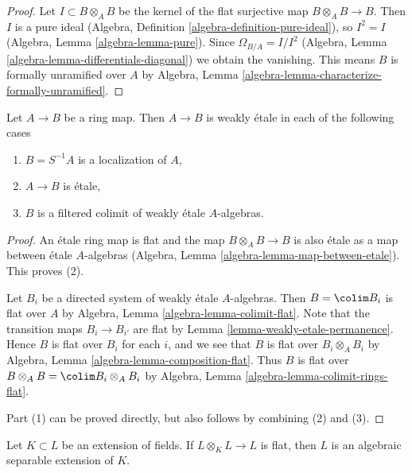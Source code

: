 \begin{proof}
Let $I \subset B \otimes_A B$ be the kernel of the flat surjective map
$B \otimes_A B \to B$. Then $I$ is a pure ideal
(Algebra, Definition \ref{algebra-definition-pure-ideal}),
so $I^2 = I$ (Algebra, Lemma \ref{algebra-lemma-pure}).
Since $\Omega_{B/A} = I/I^2$
(Algebra, Lemma \ref{algebra-lemma-differentials-diagonal})
we obtain the vanishing. This means $B$ is formally unramified over
$A$ by
Algebra, Lemma \ref{algebra-lemma-characterize-formally-unramified}.
\end{proof}

\begin{lemma}
\label{lemma-when-weakly-etale}
Let $A \to B$ be a ring map. Then $A \to B$ is weakly \'etale in each
of the following cases
\begin{enumerate}
\item $B = S^{-1}A$ is a localization of $A$,
\item $A \to B$ is \'etale,
\item $B$ is a filtered colimit of weakly \'etale $A$-algebras.
\end{enumerate}
\end{lemma}

\begin{proof}
An \'etale ring map is flat and the map $B \otimes_A B \to B$ is
also \'etale as a map between \'etale $A$-algebras
(Algebra, Lemma \ref{algebra-lemma-map-between-etale}).
This proves (2).

\medskip\noindent
Let $B_i$ be a directed system of weakly \'etale $A$-algebras.
Then $B = \colim B_i$ is flat over $A$ by
Algebra, Lemma \ref{algebra-lemma-colimit-flat}.
Note that the transition maps $B_i \to B_{i'}$ are flat
by Lemma \ref{lemma-weakly-etale-permanence}.
Hence $B$ is flat over $B_i$ for each $i$, and we see that $B$ is flat
over $B_i \otimes_A B_i$ by
Algebra, Lemma \ref{algebra-lemma-composition-flat}.
Thus $B$ is flat over $B \otimes_A B = \colim B_i \otimes_A B_i$
by Algebra, Lemma \ref{algebra-lemma-colimit-rings-flat}.

\medskip\noindent
Part (1) can be proved directly, but also follows by combining
(2) and (3).
\end{proof}

\begin{lemma}
\label{lemma-absolutely-flat-fields}
Let $K \subset L$ be an extension of fields. If $L \otimes_K L \to L$
is flat, then $L$ is an algebraic separable extension of $K$.
\end{lemma}

